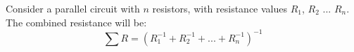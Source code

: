 \documentclass{article}
\begin{document}
Consider a parallel circuit with $n$ resistors, with resistance values $R_1$, $R_2$ ... $R_n$.
The combined resistance will be:
\[\sum{R} = (R_1^{-1} + R_2^{-1} + ... + R_n^{-1})^{-1}\]
\end{document}
